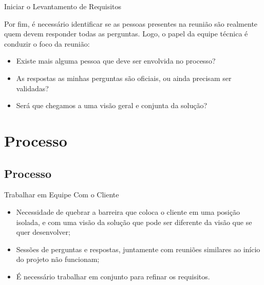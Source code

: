 \documentclass[xcolor=x11names,compress]{beamer}
\begin{document}
\begin{frame}{Iniciar o Levantamento de Requisitos}

Por fim, é necessário identificar se as pessoas presentes na reunião são realmente quem devem responder todas as perguntas. Logo, o papel da equipe técnica é conduzir o foco da reunião:

\begin{itemize}[<+->]
\itemsep 5mm 

\item Existe mais alguma pessoa que deve ser envolvida no processo?

\item As respostas as minhas perguntas são oficiais, ou ainda precisam ser validadas?

\item Será que chegamos a uma visão geral e conjunta da solução?

\end{itemize}

\end{frame}

\section{Processo}
\subsection{Processo}

\begin{frame}{Trabalhar em Equipe Com o Cliente}

\begin{itemize}
\itemsep 5mm

\item Necessidade de quebrar a barreira que coloca o cliente em uma posição isolada, e com uma visão da solução que pode ser diferente da visão que se quer desenvolver;

\item Sessões de perguntas e respostas, juntamente com reuniões similares ao início do projeto não funcionam;

\item É necessário trabalhar em conjunto para refinar os requisitos.

\end{itemize}

\end{frame}
\end{document}
